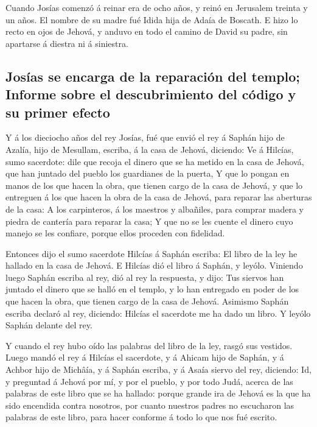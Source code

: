 Cuando Josías comenzó á reinar era de ocho años, y reinó en
Jerusalem treinta y un años. El nombre de su madre fué Idida hija de
Adaía de Boscath.  E hizo lo recto en ojos de Jehová, y
anduvo en todo el camino de David su padre, sin apartarse á diestra ni á
siniestra.

\hypertarget{josuxedas-se-encarga-de-la-reparaciuxf3n-del-templo-informe-sobre-el-descubrimiento-del-cuxf3digo-y-su-primer-efecto}{%
\subsection{Josías se encarga de la reparación del templo; Informe sobre
el descubrimiento del código y su primer
efecto}\label{josuxedas-se-encarga-de-la-reparaciuxf3n-del-templo-informe-sobre-el-descubrimiento-del-cuxf3digo-y-su-primer-efecto}}

 Y á los dieciocho años del rey Josías, fué que envió el rey
á Saphán hijo de Azalía, hijo de Mesullam, escriba, á la casa de Jehová,
diciendo:  Ve á Hilcías, sumo sacerdote: dile que recoja el
dinero que se ha metido en la casa de Jehová, que han juntado del pueblo
los guardianes de la puerta,  Y que lo pongan en manos de
los que hacen la obra, que tienen cargo de la casa de Jehová, y que lo
entreguen á los que hacen la obra de la casa de Jehová, para reparar las
aberturas de la casa:  A los carpinteros, á los maestros y
albañiles, para comprar madera y piedra de cantería para reparar la
casa;  Y que no se les cuente el dinero cuyo manejo se les
confiare, porque ellos proceden con fidelidad.

 Entonces dijo el sumo sacerdote Hilcías á Saphán escriba:
El libro de la ley he hallado en la casa de Jehová. E Hilcías dió el
libro á Saphán, y leyólo.  Viniendo luego Saphán escriba al
rey, dió al rey la respuesta, y dijo: Tus siervos han juntado el dinero
que se halló en el templo, y lo han entregado en poder de los que hacen
la obra, que tienen cargo de la casa de Jehová.  Asimismo
Saphán escriba declaró al rey, diciendo: Hilcías el sacerdote me ha dado
un libro. Y leyólo Saphán delante del rey.

 Y cuando el rey hubo oído las palabras del libro de la
ley, rasgó sus vestidos.  Luego mandó el rey á Hilcías el
sacerdote, y á Ahicam hijo de Saphán, y á Achbor hijo de Michâía, y á
Saphán escriba, y á Asaía siervo del rey, diciendo:  Id, y
preguntad á Jehová por mí, y por el pueblo, y por todo Judá, acerca de
las palabras de este libro que se ha hallado: porque grande ira de
Jehová es la que ha sido encendida contra nosotros, por cuanto nuestros
padres no escucharon las palabras de este libro, para hacer conforme á
todo lo que nos fué escrito.


